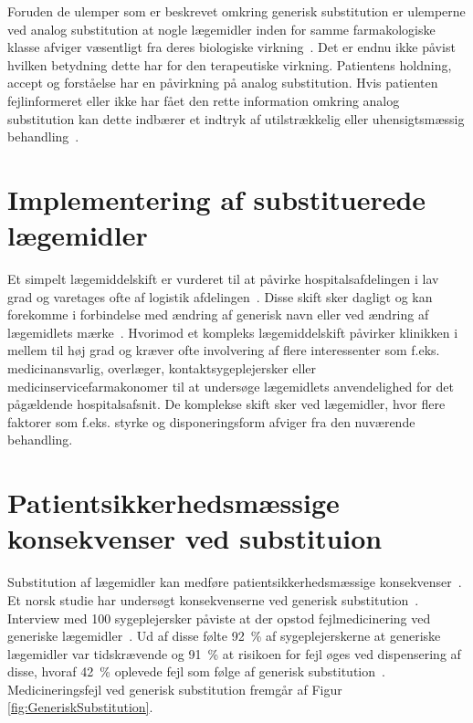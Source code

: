 Foruden de ulemper som er beskrevet omkring generisk substitution er ulemperne ved analog substitution at nogle lægemidler inden for samme farmakologiske klasse afviger væsentligt fra deres biologiske virkning~\citep{Kairi2017}. Det er endnu ikke påvist hvilken betydning dette har for den terapeutiske virkning. Patientens holdning, accept og forståelse har en påvirkning på analog substitution. Hvis patienten fejlinformeret eller ikke har fået den rette information omkring analog substitution kan dette indbærer et indtryk af utilstrækkelig eller uhensigtsmæssig behandling~\citep{Kairi2017}.
 

\section{Implementering af substituerede lægemidler}
Et simpelt lægemiddelskift er vurderet til at påvirke hospitalsafdelingen i lav grad og varetages ofte af logistik afdelingen~\citep{Laegemiddelinformaion2017, Sygehusapoteket2017a}. Disse skift sker dagligt og kan forekomme i forbindelse med ændring af generisk navn eller ved ændring af lægemidlets mærke~\citep{Sygehusapoteket2017a, Kairi2017}. Hvorimod et kompleks lægemiddelskift påvirker klinikken i mellem til høj grad og kræver ofte involvering af flere interessenter som f.eks. medicinansvarlig, overlæger, kontaktsygeplejersker eller medicinservicefarmakonomer til at undersøge lægemidlets anvendelighed for det pågældende hospitalsafsnit. 
De komplekse skift sker ved lægemidler, hvor flere faktorer som f.eks. styrke og disponeringsform afviger fra den nuværende behandling.~\citep{Laegemiddelinformaion2017,Sygehusapoteket2017a}

\section{Patientsikkerhedsmæssige konsekvenser ved substituion} \label{sec:ProblemLaeg}
Substitution af lægemidler kan medføre patientsikkerhedsmæssige konsekvenser~\citep{DanskSelskabforPatientsikkerhed2009}. 
Et norsk studie har undersøgt konsekvenserne ved generisk substitution~\citep{Hakonsen2010}. Interview med 100 sygeplejersker påviste at der opstod fejlmedicinering ved generiske lægemidler~\citep{Hakonsen2010}. Ud af disse følte 92~\% af sygeplejerskerne at generiske lægemidler var tidskrævende og 91~\% at risikoen for fejl øges ved dispensering af disse, hvoraf 42~\% oplevede fejl som følge af generisk substitution~\citep{Hakonsen2010}.
Medicineringsfejl ved generisk substitution fremgår af Figur \ref{fig:GeneriskSubstitution}.

